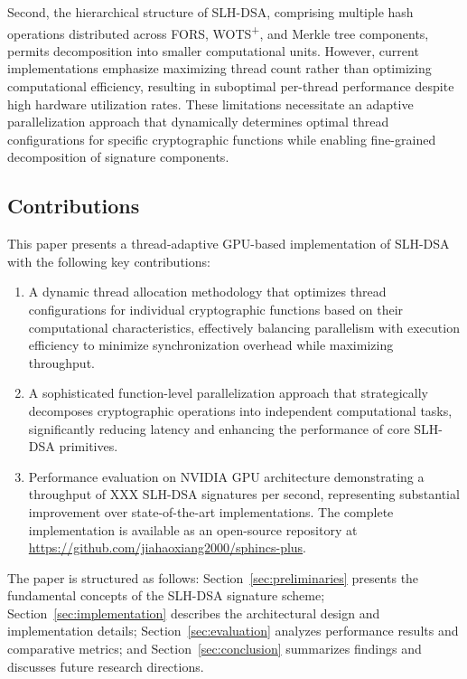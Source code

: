\documentclass[journal]{IEEEtran}
\begin{document}
Second, the hierarchical structure of SLH-DSA, comprising multiple hash operations distributed across FORS, WOTS\textsuperscript{+}, and Merkle tree components, permits decomposition into smaller computational units. However, current implementations emphasize maximizing thread count rather than optimizing computational efficiency, resulting in suboptimal per-thread performance despite high hardware utilization rates.
These limitations necessitate an adaptive parallelization approach that dynamically determines optimal thread configurations for specific cryptographic functions while enabling fine-grained decomposition of signature components.

\subsection{Contributions}

This paper presents a thread-adaptive GPU-based implementation of SLH-DSA with the following key contributions:

\begin{enumerate}
  \item A dynamic thread allocation methodology that optimizes thread configurations for individual cryptographic functions based on their computational characteristics, effectively balancing parallelism with execution efficiency to minimize synchronization overhead while maximizing throughput.

  \item A sophisticated function-level parallelization approach that strategically decomposes cryptographic operations into independent computational tasks, significantly reducing latency and enhancing the performance of core SLH-DSA primitives.

  \item Performance evaluation on NVIDIA GPU architecture demonstrating a throughput of XXX SLH-DSA signatures per second, representing substantial improvement over state-of-the-art implementations.
    The complete implementation is available as an open-source repository at \url{https://github.com/jiahaoxiang2000/sphincs-plus}.
\end{enumerate}

The paper is structured as follows: Section~\ref{sec:preliminaries} presents the fundamental concepts of the SLH-DSA signature scheme; Section~\ref{sec:implementation} describes the architectural design and implementation details; Section~\ref{sec:evaluation} analyzes performance results and comparative metrics; and Section~\ref{sec:conclusion} summarizes findings and discusses future research directions.
\end{document}
